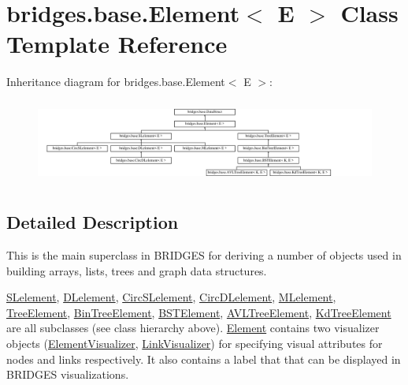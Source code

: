 \hypertarget{classbridges_1_1base_1_1_element}{}\section{bridges.\+base.\+Element$<$ E $>$ Class Template Reference}
\label{classbridges_1_1base_1_1_element}
Inheritance diagram for bridges.\+base.\+Element$<$ E $>$\+:\begin{figure}[H]
\begin{center}
\leavevmode
\includegraphics[height=2.788382cm]{classbridges_1_1base_1_1_element}
\end{center}
\end{figure}


\subsection{Detailed Description}
This is the main superclass in B\+R\+I\+D\+G\+ES for deriving a number of objects used in building arrays, lists, trees and graph data structures. 

\hyperlink{classbridges_1_1base_1_1_s_lelement}{S\+Lelement}, \hyperlink{classbridges_1_1base_1_1_d_lelement}{D\+Lelement}, \hyperlink{classbridges_1_1base_1_1_circ_s_lelement}{Circ\+S\+Lelement}, \hyperlink{classbridges_1_1base_1_1_circ_d_lelement}{Circ\+D\+Lelement}, \hyperlink{classbridges_1_1base_1_1_m_lelement}{M\+Lelement}, \hyperlink{classbridges_1_1base_1_1_tree_element}{Tree\+Element}, \hyperlink{classbridges_1_1base_1_1_bin_tree_element}{Bin\+Tree\+Element}, \hyperlink{classbridges_1_1base_1_1_b_s_t_element}{B\+S\+T\+Element}, \hyperlink{classbridges_1_1base_1_1_a_v_l_tree_element}{A\+V\+L\+Tree\+Element}, \hyperlink{classbridges_1_1base_1_1_kd_tree_element}{Kd\+Tree\+Element} are all subclasses (see class hierarchy above). \hyperlink{classbridges_1_1base_1_1_element}{Element} contains two visualizer objects (\hyperlink{classbridges_1_1base_1_1_element_visualizer}{Element\+Visualizer}, \hyperlink{classbridges_1_1base_1_1_link_visualizer}{Link\+Visualizer}) for specifying visual attributes for nodes and links respectively. It also contains a label that that can be displayed in B\+R\+I\+D\+G\+ES visualizations.

